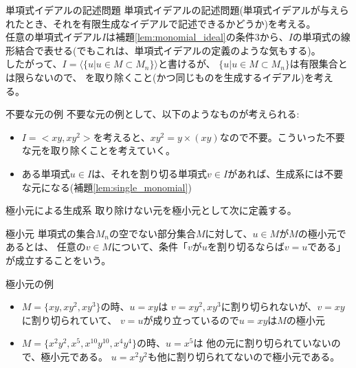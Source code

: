\begin{frame} {単項式イデアルの記述問題}
	単項式イデアルの記述問題(単項式イデアルが与えられたとき、それを有限生成なイデアルで記述できるかどうか)を考える。\\
	任意の単項式イデアル$I$は補題\ref{lem:monomial_ideal}の条件3から、$I$の単項式の線形結合で表せる(でもこれは、単項式イデアルの定義のような気もする)。\\
	したがって、$I=\langle \{u | u \in M \subset M_n \} \rangle$と書けるが、
	$\{u | u \in M \subset M_n \}$は有限集合とは限らないので、
	を取り除くこと(かつ同じものを生成するイデアル)を考える。\\
	\begin{exampleblock} {不要な元の例}
		不要な元の例として、以下のようなものが考えられる:
		\begin{itemize}
			\item $I=<xy, xy^2>$を考えると、$xy^2 = y \times (xy)$なので不要。こういった不要な元を取り除くことを考えていく。
			\item ある単項式$u \in I$は、それを割り切る単項式$v \in I$があれば、生成系には不要な元になる(補題\ref{lem:single_monomial})
		\end{itemize}
	\end{exampleblock}
\end{frame}

\begin{frame} {極小元による生成系}
	取り除けない元を極小元として次に定義する。
	\begin{definition} {極小元}
		単項式の集合$M_n$の空でない部分集合$M$に対して、$u \in M$が$M$の極小元であるとは、
		任意の$v \in M$について、条件「$v$が$u$を割り切るならば$v=u$である」が成立することをいう。
	\end{definition}
	\begin{exampleblock} {極小元の例}
		\begin{itemize}
			\item $M = \{xy, xy^2, xy^3\}$の時、$u=xy$は
			      $v=xy^2, xy^3$に割り切られないが、$v=xy$に割り切られていて、
			      $v=u$が成り立っているので$u=xy$は$M$の極小元
			\item $M = \{x^2y^2, x^5, x^10y^10, x^4y^4\}$の時、$u=x^5$は
			      他の元に割り切られていないので、極小元である。
			      $u=x^2y^2$も他に割り切られてないので極小元である。
		\end{itemize}
	\end{exampleblock}
\end{frame}

